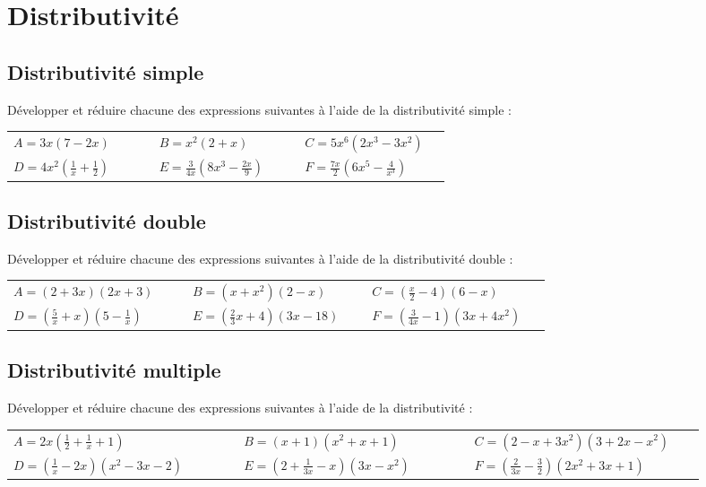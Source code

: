 \documentclass[oneside,12pt]{article}          %
\begin{document}
\renewcommand{\arraystretch}{1.7}

\section{Distributivité}

\subsection{Distributivité simple}
Développer et réduire chacune des expressions suivantes à l'aide de la distributivité simple :

\begin{tabular}{p{0.3\linewidth} p{0.3\linewidth} p{0.3\linewidth}}
	$A=3x(7-2x)$ & $B=x^2(2+x)$ & $C=5x^6(2x^3-3x^2)$ \\
	$D=4x^2\left(\frac{1}{x}+\frac{1}{2}\right)$ & $E=\frac{3}{4x}\left(8x^3-\frac{2x}{9}\right)$ & $F=\frac{7x}{2}\left(6x^5-\frac{4}{x^3}\right)$
\end{tabular}



\subsection{Distributivité double}
Développer et réduire chacune des expressions suivantes à l'aide de la distributivité double :

\begin{tabular}{p{0.3\linewidth} p{0.3\linewidth} p{0.3\linewidth}}
	$A=(2+3x)(2x+3)$ & $B=(x+x^2)(2-x)$ & $C=\left(\frac{x}{2}-4\right)(6-x)$ \\
	$D=\left(\frac{5}{x}+x\right)\left(5-\frac{1}{x}\right)$ & $E=\left(\frac{2}{3}x+4\right)(3x-18)$ & $F=\left(\frac{3}{4x}-1\right)(3x+4x^2)$ \\
\end{tabular}



\subsection{Distributivité multiple}
Développer et réduire chacune des expressions suivantes à l'aide de la distributivité :

\begin{tabular}{p{0.3\linewidth} p{0.3\linewidth} p{0.3\linewidth}}
	$A=2x\left(\frac{1}{2}+\frac{1}{x}+1\right)$ & $B=(x+1)(x^2+x+1)$ &  $C=(2-x+3x^2)(3+2x-x^2)$ \\
	$D=\left(\frac{1}{x}-2x\right)(x^2-3x-2)$ & $E=\left(2+\frac{1}{3x}-x\right)(3x-x^2)$ & $F=\left(\frac{2}{3x}-\frac{3}{2}\right)(2x^2+3x+1)$
\end{tabular}
\end{document}
